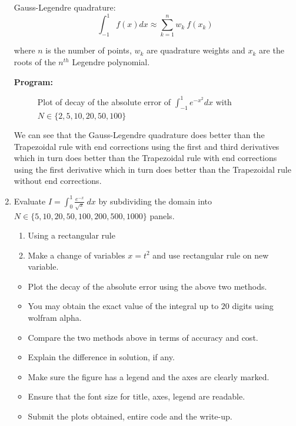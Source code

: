 \documentclass[a4paper,11pt]{report}
\begin{document}
\begin{enumerate}
    Gauss-Legendre quadrature:
    \begin{equation*}
    \int_{-1}^{1} f(x) dx \approx \sum_{k=1}^{n} w_{k}\ f(x_{k})
    \end{equation*}

    where $n$ is the number of points, $w_{k}$ are quadrature weights and 
    $x_{k}$ are the roots of the $n^{th}$ Legendre polynomial. 
            
    \pagebreak

    \textbf{Program:}
    
    
    \vspace{-0.5cm}

    \begin{figure}[ht!]
    \centering
    \resizebox{0.95\linewidth}{!}{}
    \caption{Plot of decay of the absolute error of $\displaystyle 
    \int_{-1}^{1} e^{-x^2} dx$ with $N \in \{2, 5, 10, 20, 50, 100\}$}
    \end{figure}
    
    \vspace{-0.3cm}
    

    We can see that the Gauss-Legendre quadrature does better than the 
    Trapezoidal rule with end corrections using the first and third derivatives
    which in turn does better than the Trapezoidal rule with end corrections
    using the first derivative which in turn does better than the Trapezoidal 
    rule without end corrections.

    \vspace{1cm}

    \item Evaluate $I = \displaystyle \int_{0}^{1} \frac{e^{-x}}{\sqrt{x}}\ dx$
    by subdividing the domain into $N \in \{5, 10, 20, 50, 100, 200, 500, 
    1000\}$ panels.

    \begin{enumerate}
    \item Using a rectangular rule
    \item Make a change of variables $x = t^{2}$ and use rectangular rule on 
    new variable.
    \end{enumerate}

    \begin{itemize}
    \item Plot the decay of the absolute error using the above two methods.
    \item You may obtain the exact value of the integral up to $20$ digits 
    using wolfram alpha.
    \item Compare the two methods above in terms of accuracy and cost.
    \item Explain the difference in solution, if any.
    \item Make sure the figure has a legend and the axes are clearly marked.
    \item Ensure that the font size for title, axes, legend are readable.
    \item Submit the plots obtained, entire code and the write-up.
    \end{itemize}
    

\end{enumerate}
\end{document}
